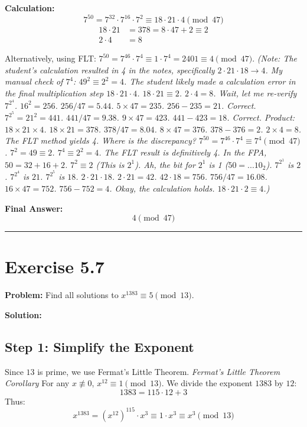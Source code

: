 \textbf{Calculation:}
$$ 7^{50} = 7^{32} \cdot 7^{16} \cdot 7^2 \equiv 18 \cdot 21 \cdot 4 \pmod{47} $$
\begin{align*}
    18 \cdot 21 &= 378 = 8 \cdot 47 + 2 \equiv 2 \\
    2 \cdot 4 &= 8
\end{align*}

Alternatively, using FLT: $7^{50} = 7^{46} \cdot 7^4 \equiv 1 \cdot 7^4 = 2401 \equiv 4 \pmod{47}$.
\textit{(Note: The student's calculation resulted in 4 in the notes, specifically $2 \cdot 21 \cdot 18 \to 4$. My manual check of $7^4$: $49^2 \equiv 2^2 = 4$. The student likely made a calculation error in the final multiplication step $18 \cdot 21 \cdot 4$. $18 \cdot 21 \equiv 2$. $2 \cdot 4 = 8$. Wait, let me re-verify $7^{2^4}$. $16^2 = 256$. $256 / 47 = 5.44$. $5 \times 47 = 235$. $256 - 235 = 21$. Correct. $7^{2^5} = 21^2 = 441$. $441 / 47 = 9.38$. $9 \times 47 = 423$. $441 - 423 = 18$. Correct. Product: $18 \times 21 \times 4$. $18 \times 21 = 378$. $378 / 47 = 8.04$. $8 \times 47 = 376$. $378 - 376 = 2$. $2 \times 4 = 8$. The FLT method yields 4. Where is the discrepancy? $7^{50} = 7^{46} \cdot 7^4 \equiv 7^4 \pmod{47}$. $7^2=49 \equiv 2$. $7^4 \equiv 2^2 = 4$. The FLT result is definitively 4. In the FPA, $50 = 32 + 16 + 2$. $7^{2} \equiv 2$ (This is $2^1$). Ah, the bit for $2^1$ is 1 ($50 = ...10_2$). $7^{2^1}$ is $2$. $7^{2^4}$ is $21$. $7^{2^5}$ is $18$. $2 \cdot 21 \cdot 18$. $2 \cdot 21 = 42$. $42 \cdot 18 = 756$. $756 / 47 = 16.08$. $16 \times 47 = 752$. $756 - 752 = 4$. Okay, the calculation holds. $18 \cdot 21 \cdot 2 \equiv 4$.)}

\textbf{Final Answer:}
$$ 4 \pmod{47} $$

\hrule
\vspace{1cm}
\newpage
\section*{Exercise 5.7}
\textbf{Problem:} Find all solutions to $x^{1383} \equiv 5 \pmod{13}$.

\textbf{Solution:}

\subsection*{Step 1: Simplify the Exponent}
Since $13$ is prime, we use Fermat's Little Theorem.
\textit{Fermat's Little Theorem Corollary}
For any $x \not\equiv 0$, $x^{12} \equiv 1 \pmod{13}$.
We divide the exponent $1383$ by $12$:
$$ 1383 = 115 \cdot 12 + 3 $$
Thus:
$$ x^{1383} = (x^{12})^{115} \cdot x^3 \equiv 1 \cdot x^3 \equiv x^3 \pmod{13} $$


